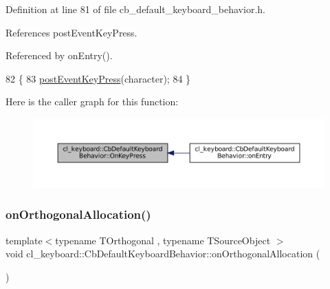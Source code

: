 Definition at line 81 of file cb\+\_\+default\+\_\+keyboard\+\_\+behavior.\+h.



References post\+Event\+Key\+Press.



Referenced by on\+Entry().


\begin{DoxyCode}
82     \{
83         \hyperlink{classcl__keyboard_1_1CbDefaultKeyboardBehavior_abd29833a0f94aa1d5aa1834d15ab1281}{postEventKeyPress}(character);
84     \}
\end{DoxyCode}
Here is the caller graph for this function\+:
\nopagebreak
\begin{figure}[H]
\begin{center}
\leavevmode
\includegraphics[width=350pt]{classcl__keyboard_1_1CbDefaultKeyboardBehavior_aa834f8e626a306920e536e7535041ac3_icgraph}
\end{center}
\end{figure}
\mbox{\label{classcl__keyboard_1_1CbDefaultKeyboardBehavior_af6cae1d7ce3f51e6843d3ac5da7966dc}} 
\subsubsection{\texorpdfstring{on\+Orthogonal\+Allocation()}{onOrthogonalAllocation()}}
{\footnotesize\ttfamily template$<$typename T\+Orthogonal , typename T\+Source\+Object $>$ \\
void cl\+\_\+keyboard\+::\+Cb\+Default\+Keyboard\+Behavior\+::on\+Orthogonal\+Allocation (\begin{DoxyParamCaption}{ }\end{DoxyParamCaption})\hspace{0.3cm}{\ttfamily [inline]}}



